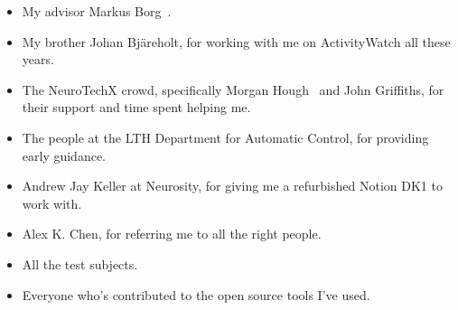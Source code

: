 \documentclass[a4paper]{article}
\begin{document}
\begin{refsection}
\begin{itemize}
 \item My advisor Markus Borg~.
 \item My brother Johan Bjäreholt, for working with me on ActivityWatch all these years.
 \item The NeuroTechX crowd, specifically Morgan Hough~ and John Griffiths, for their support and time spent helping me.
 \item The people at the LTH Department for Automatic Control, for providing early guidance.
 \item Andrew Jay Keller at Neurosity, for giving me a refurbished Notion DK1 to work with.
 \item Alex K. Chen, for referring me to all the right people.
 \item All the test subjects.
 \item Everyone who's contributed to the open source tools I've used.
\end{itemize}


\printbibliography[category=cited]

\nocite{*}
  {\list{}
     {\setlength{\leftmargin}{\bibhang}%
      \setlength{\itemindent}{-\leftmargin}%
      \setlength{\itemsep}{\bibitemsep}%
      \setlength{\parsep}{\bibparsep}}
  }
  {\endlist}
  {\item}
\printbibliography[notcategory=cited, env=bibnonum, heading=notcited]

\end{refsection}
\end{document}

